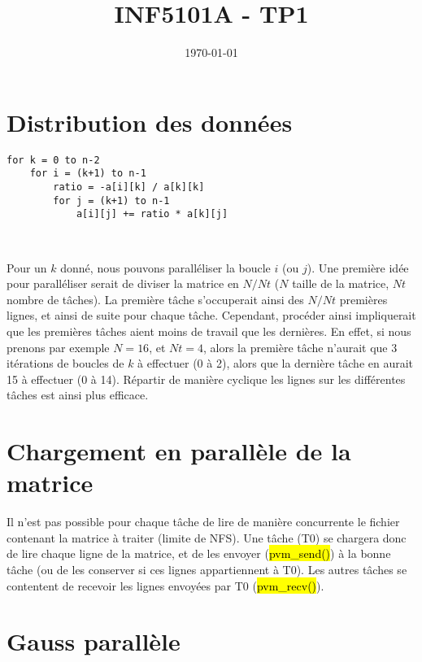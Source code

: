 \documentclass[a4paper,tikz]{article}
\title{INF5101A - TP1}
\date{\today}
\begin{document}
\maketitle
\newpage
\tableofcontents
\newpage

\section{Distribution des données}

\begin{lstlisting}
for k = 0 to n-2
	for i = (k+1) to n-1
		ratio = -a[i][k] / a[k][k]
		for j = (k+1) to n-1
			a[i][j] += ratio * a[k][j]
\end{lstlisting}
\

Pour un $k$ donné, nous pouvons paralléliser la boucle $i$ (ou $j$). Une première
idée pour paralléliser serait de diviser la matrice en $N/Nt$ ($N$ taille de la
matrice, $Nt$ nombre de tâches). La première tâche s'occuperait ainsi des $N/Nt$
premières lignes, et ainsi de suite pour chaque tâche. Cependant, procéder ainsi
impliquerait que les premières tâches aient moins de travail que les dernières.
En effet, si nous prenons par exemple $N = 16$, et $Nt = 4$, alors la première
tâche n'aurait que 3 itérations de boucles de $k$ à effectuer (0 à 2), alors que
la dernière tâche en aurait 15 à effectuer (0 à 14). Répartir de manière cyclique
les lignes sur les différentes tâches est ainsi plus efficace.

\newpage

\section{Chargement en parallèle de la matrice}

Il n'est pas possible pour chaque tâche de lire de manière concurrente le
fichier contenant la matrice à traiter (limite de NFS). Une tâche (T0) se chargera
donc de lire chaque ligne de la matrice, et de les envoyer (\hl{pvm\_send()}) à
la bonne tâche (ou de les conserver si ces lignes appartiennent à T0). Les
autres tâches se contentent de recevoir les lignes envoyées par T0
(\hl{pvm\_recv()}).\\




\newpage

\section{Gauss parallèle}
\end{document}
